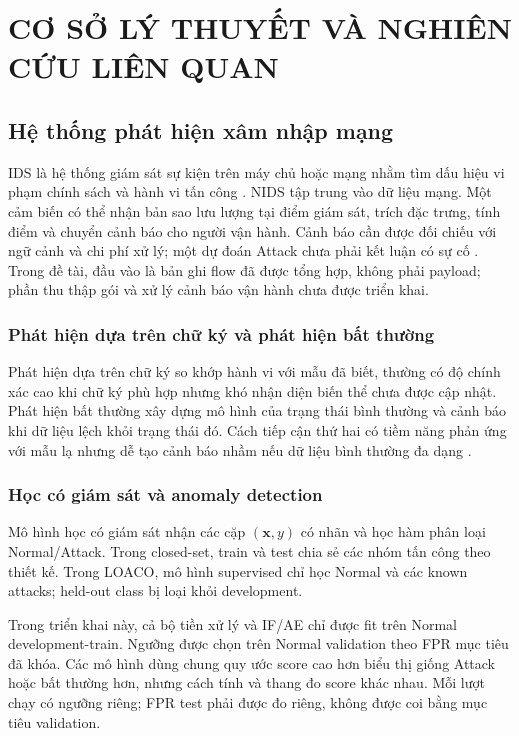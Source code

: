 \documentclass[12pt,a4paper,oneside]{report}
\begin{document}
\chapter{CƠ SỞ LÝ THUYẾT VÀ NGHIÊN CỨU LIÊN QUAN}

\section{Hệ thống phát hiện xâm nhập mạng}

IDS là hệ thống giám sát sự kiện trên máy chủ hoặc mạng nhằm tìm dấu hiệu vi phạm chính sách và hành vi tấn công \cite{nist80094}. NIDS tập trung vào dữ liệu mạng. Một cảm biến có thể nhận bản sao lưu lượng tại điểm giám sát, trích đặc trưng, tính điểm và chuyển cảnh báo cho người vận hành. Cảnh báo cần được đối chiếu với ngữ cảnh và chi phí xử lý; một dự đoán Attack chưa phải kết luận có sự cố \cite{nist80094,sommer2010}. Trong đề tài, đầu vào là bản ghi flow đã được tổng hợp, không phải payload; phần thu thập gói và xử lý cảnh báo vận hành chưa được triển khai.

\subsection{Phát hiện dựa trên chữ ký và phát hiện bất thường}

Phát hiện dựa trên chữ ký so khớp hành vi với mẫu đã biết, thường có độ chính xác cao khi chữ ký phù hợp nhưng khó nhận diện biến thể chưa được cập nhật. Phát hiện bất thường xây dựng mô hình của trạng thái bình thường và cảnh báo khi dữ liệu lệch khỏi trạng thái đó. Cách tiếp cận thứ hai có tiềm năng phản ứng với mẫu lạ nhưng dễ tạo cảnh báo nhầm nếu dữ liệu bình thường đa dạng \cite{chandola2009}.

\subsection{Học có giám sát và anomaly detection}

Mô hình học có giám sát nhận các cặp $(\mathbf{x},y)$ có nhãn và học hàm phân loại Normal/Attack. Trong closed-set, train và test chia sẻ các nhóm tấn công theo thiết kế. Trong LOACO, mô hình supervised chỉ học Normal và các known attacks; held-out class bị loại khỏi development.

Trong triển khai này, cả bộ tiền xử lý và IF/AE chỉ được fit trên Normal development-train. Ngưỡng được chọn trên Normal validation theo FPR mục tiêu đã khóa. Các mô hình dùng chung quy ước score cao hơn biểu thị giống Attack hoặc bất thường hơn, nhưng cách tính và thang đo score khác nhau. Mỗi lượt chạy có ngưỡng riêng; FPR test phải được đo riêng, không được coi bằng mục tiêu validation.
\end{document}
